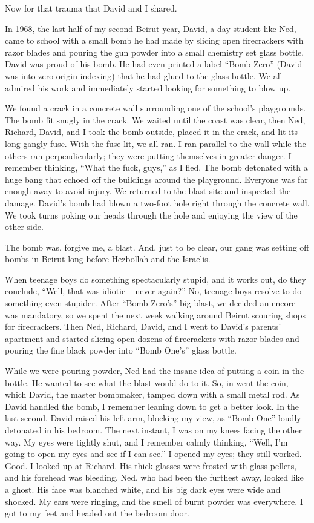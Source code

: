 Now for that trauma that David and I shared.

In 1968, the last half of my second Beirut year, David, a day student
like Ned, came to school with a small bomb he had made by slicing open
firecrackers with razor blades and pouring the gun powder into a small
chemistry set glass bottle. David was proud of his bomb. He had even
printed a label ``Bomb Zero'' (David was into zero-origin indexing) that
he had glued to the glass bottle. We all admired his work and
immediately started looking for something to blow up.

We found a crack in a concrete wall surrounding one of the school's
playgrounds. The bomb fit snugly in the crack. We waited until the coast
was clear, then Ned, Richard, David, and I took the bomb outside, placed
it in the crack, and lit its long gangly fuse. With the fuse lit, we all
ran. I ran parallel to the wall while the others ran perpendicularly;
they were putting themselves in greater danger. I remember thinking,
``What the fuck, guys,'' as I fled. The bomb detonated with a huge bang
that echoed off the buildings around the playground. Everyone was far
enough away to avoid injury. We returned to the blast site and inspected
the damage. David's bomb had blown a two-foot hole right through the
concrete wall. We took turns poking our heads through the hole and
enjoying the view of the other side.

The bomb was, forgive me, a blast. And, just to be clear, our gang was
setting off bombs in Beirut long before Hezbollah and the Israelis.

When teenage boys do something spectacularly stupid, and it works out,
do they conclude, ``Well, that was idiotic -- never again?'' No, teenage
boys resolve to do something even stupider. After ``Bomb Zero's'' big
blast, we decided an encore was mandatory, so we spent the next week
walking around Beirut scouring shops for firecrackers. Then Ned,
Richard, David, and I went to David's parents' apartment and started
slicing open dozens of firecrackers with razor blades and pouring the
fine black powder into ``Bomb One's'' glass bottle.

While we were pouring powder, Ned had the insane idea of putting a coin
in the bottle. He wanted to see what the blast would do to it. So, in
went the coin, which David, the master bombmaker, tamped down with a
small metal rod. As David handled the bomb, I remember leaning down to
get a better look. In the last second, David raised his left arm,
blocking my view, as ``Bomb One'' loudly detonated in his bedroom. The
next instant, I was on my knees facing the other way. My eyes were
tightly shut, and I remember calmly thinking, ``Well, I'm going to open
my eyes and see if I can see.'' I opened my eyes; they still worked.
Good. I looked up at Richard. His thick glasses were frosted with glass
pellets, and his forehead was bleeding. Ned, who had been the furthest
away, looked like a ghost. His face was blanched white, and his big dark
eyes were wide and shocked. My ears were ringing, and the smell of burnt
powder was everywhere. I got to my feet and headed out the bedroom door.

